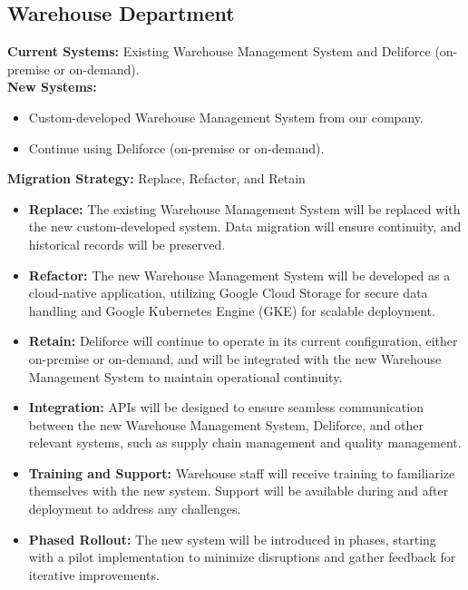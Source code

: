 \subsection{Warehouse Department}
\textbf{Current Systems:} Existing Warehouse Management System and Deliforce (on-premise or on-demand). \\
\textbf{New Systems:}
\begin{itemize}
    \item Custom-developed Warehouse Management System from our company.
    \item Continue using Deliforce (on-premise or on-demand).
\end{itemize}
\textbf{Migration Strategy:} Replace, Refactor, and Retain
\begin{itemize}
    \item \textbf{Replace:} The existing Warehouse Management System will be replaced with the new custom-developed system. Data migration will ensure continuity, and historical records will be preserved.
    \item \textbf{Refactor:} The new Warehouse Management System will be developed as a cloud-native application, utilizing Google Cloud Storage for secure data handling and Google Kubernetes Engine (GKE) for scalable deployment.
    \item \textbf{Retain:} Deliforce will continue to operate in its current configuration, either on-premise or on-demand, and will be integrated with the new Warehouse Management System to maintain operational continuity.
    \item \textbf{Integration:} APIs will be designed to ensure seamless communication between the new Warehouse Management System, Deliforce, and other relevant systems, such as supply chain management and quality management.
    \item \textbf{Training and Support:} Warehouse staff will receive training to familiarize themselves with the new system. Support will be available during and after deployment to address any challenges.
    \item \textbf{Phased Rollout:} The new system will be introduced in phases, starting with a pilot implementation to minimize disruptions and gather feedback for iterative improvements.
\end{itemize}

